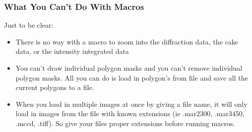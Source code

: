 \subsubsection{What You Can't Do With Macros}

Just to be clear:
\begin{itemize}
    \item There is no way with a macro to zoom into the diffraction
    data, the cake data, or the intensity integrated data
    \item You can't draw individual polygon masks and you can't remove
    individual polygon masks. All you can do is load in polygon's from
    file and save all the current polygons to a file.
    \item When you load in multiple images at once by giving a file 
    name, it will only load in images from the file with known 
    extensions (ie .mar2300, .mar3450, .mccd, .tiff). So give your 
    files proper extensions before running macros.
\end{itemize}

